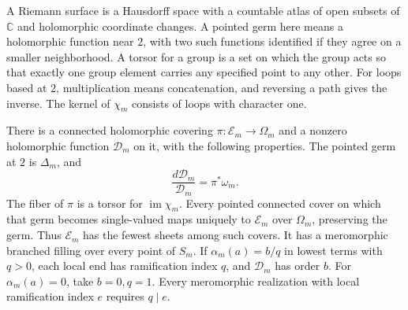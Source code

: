A Riemann surface is a Hausdorff space with a countable atlas of open
subsets of \(\mathbb C\) and holomorphic coordinate changes.
A pointed germ here means a holomorphic function near \(2\), with
two such functions identified if they agree on a smaller neighborhood.
A torsor for a group is a set on which the group acts so that exactly
one group element carries any specified point to any other.
For loops based at \(2\), multiplication means concatenation, and
reversing a path gives the inverse.  The kernel of \(\chi_m\) consists
of loops with character one.

\begin{theorem}
\label{thm:minimal-cover}\label{mono:prop:local}
There is a connected holomorphic covering
\(\pi:\mathcal E_m\to\Omega_m\) and a nonzero holomorphic function
\(\mathcal D_m\) on it, with the following properties.
The pointed germ at \(2\) is \(\Delta_m\), and
\[
 \frac{d\mathcal D_m}{\mathcal D_m}=\pi^*\omega_m.
\]
The fiber of \(\pi\) is a torsor for \(\operatorname{im}\chi_m\).
Every pointed connected cover on which that germ becomes single-valued
maps uniquely to \(\mathcal E_m\) over \(\Omega_m\), preserving the germ.
Thus \(\mathcal E_m\) has the fewest sheets among such covers.
It has a meromorphic branched filling over every point of \(S_m\).
If \(\alpha_m(a)=b/q\) in lowest terms with \(q>0\), each local end
has ramification index \(q\), and \(\mathcal D_m\) has order \(b\).
For \(\alpha_m(a)=0\), take \(b=0,q=1\).
Every meromorphic realization with local ramification index \(e\)
requires \(q\mid e\).
\end{theorem}


